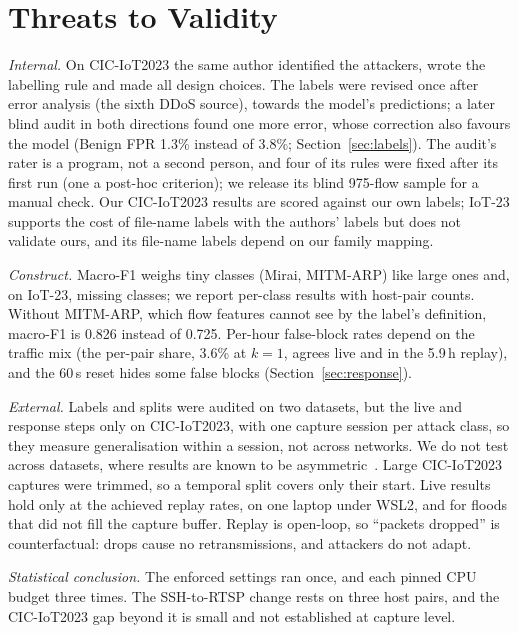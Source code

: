 \section{Threats to Validity}\label{sec:threats}

\emph{Internal.} On CIC-IoT2023 the same author identified the attackers, wrote the labelling rule and made all design choices. The labels were revised once after error analysis (the sixth DDoS source), towards the model's predictions; a later blind audit in both directions found one more error, whose correction also favours the model (Benign FPR 1.3\% instead of 3.8\%; Section~\ref{sec:labels}). The audit's rater is a program, not a second person, and four of its rules were fixed after its first run (one a post-hoc criterion); we release its blind 975-flow sample for a manual check. Our CIC-IoT2023 results are scored against our own labels; IoT-23 supports the cost of file-name labels with the authors' labels but does not validate ours, and its file-name labels depend on our family mapping.

\emph{Construct.} Macro-F1 weighs tiny classes (Mirai, MITM-ARP) like large ones and, on IoT-23, missing classes; we report per-class results with host-pair counts. Without MITM-ARP, which flow features cannot see by the label's definition, macro-F1 is 0.826 instead of 0.725. Per-hour false-block rates depend on the traffic mix (the per-pair share, 3.6\% at $k=1$, agrees live and in the 5.9\,h replay), and the 60\,s reset hides some false blocks (Section~\ref{sec:response}).

\emph{External.} Labels and splits were audited on two datasets, but the live and response steps only on CIC-IoT2023, with one capture session per attack class, so they measure generalisation within a session, not across networks. We do not test across datasets, where results are known to be asymmetric~\cite{ali2026siamxbert}. Large CIC-IoT2023 captures were trimmed, so a temporal split covers only their start. Live results hold only at the achieved replay rates, on one laptop under WSL2, and for floods that did not fill the capture buffer. Replay is open-loop, so ``packets dropped'' is counterfactual: drops cause no retransmissions, and attackers do not adapt.

\emph{Statistical conclusion.} The enforced settings ran once, and each pinned CPU budget three times. The SSH-to-RTSP change rests on three host pairs, and the CIC-IoT2023 gap beyond it is small and not established at capture level.

